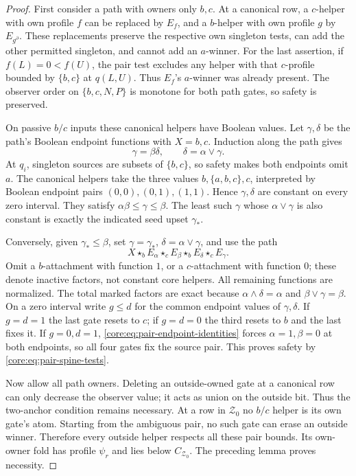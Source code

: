 \begin{proof}
First consider a path with owners only $b,c$.
At a canonical row, a $c$-helper with own profile $f$ can be replaced
by $E_f$, and a $b$-helper with own profile $g$ by $E_{g^\partial}$.
These replacements preserve the respective own singleton tests,
can add the other permitted singleton, and cannot add an $a$-winner.
For the last assertion, if $f(L)=0<f(U)$, the pair test excludes any
helper with that $c$-profile bounded by $\{b,c\}$ at $q(L,U)$.
Thus $E_f$'s $a$-winner was already present. The observer order on
$\{b,c,N,P\}$ is monotone for both path gates, so safety is preserved.

On passive $b/c$ inputs these canonical helpers have Boolean values.
Let $\gamma,\delta$ be the path's Boolean endpoint functions with
$X=b,c$. Induction along the path gives
\begin{equation}\label{core:eq:pair-endpoint-identities}
 \gamma=\beta\delta,\qquad \delta=\alpha\lor\gamma.
\end{equation}
At $q_i$, singleton sources are subsets of $\{b,c\}$, so safety makes
both endpoints omit $a$. The canonical helpers take the three values
$b,\{a,b,c\},c$, interpreted by Boolean endpoint pairs
$(0,0),(0,1),(1,1)$. Hence $\gamma,\delta$ are constant on every
zero interval. They satisfy $\alpha\beta\leq\gamma\leq\beta$.
The least such $\gamma$ whose $\alpha\lor\gamma$ is also constant
is exactly the indicated seed upset $\gamma_*$.

Conversely, given $\gamma_*\leq\beta$, set
$\gamma=\gamma_*$, $\delta=\alpha\lor\gamma$, and use the path
\begin{equation}\label{core:eq:four-pair-helpers}
 X\star_b E_\alpha\star_c E_\beta
   \star_b E_\delta\star_c E_\gamma.
\end{equation}
Omit a $b$-attachment with function $1$, or a $c$-attachment with
function $0$; these denote inactive factors, not constant core helpers.
All remaining functions are normalized. The total marked factors are
exact because $\alpha\land\delta=\alpha$ and
$\beta\lor\gamma=\beta$.
On a zero interval write $g\leq d$ for the common endpoint values
of $\gamma,\delta$. If $g=d=1$ the last gate resets to $c$;
if $g=d=0$ the third resets to $b$ and the last fixes it.
If $g=0,d=1$, \eqref{core:eq:pair-endpoint-identities} forces
$\alpha=1,\beta=0$ at both endpoints, so all four gates fix the
source pair. This proves safety by \eqref{core:eq:pair-spine-tests}.

Now allow all path owners. Deleting an outside-owned gate at a
canonical row can only decrease the observer value; it acts as union
on the outside bit. Thus the two-anchor condition remains necessary.
At a row in $\mathcal Z_0$ no $b/c$ helper is its own gate's atom.
Starting from the ambiguous pair, no such gate can erase an outside
winner. Therefore every outside helper respects all these pair bounds.
Its own-owner fold has profile $\psi_r$ and lies below
$C_{\mathcal Z_0}$. The preceding lemma proves necessity.


\end{proof}
